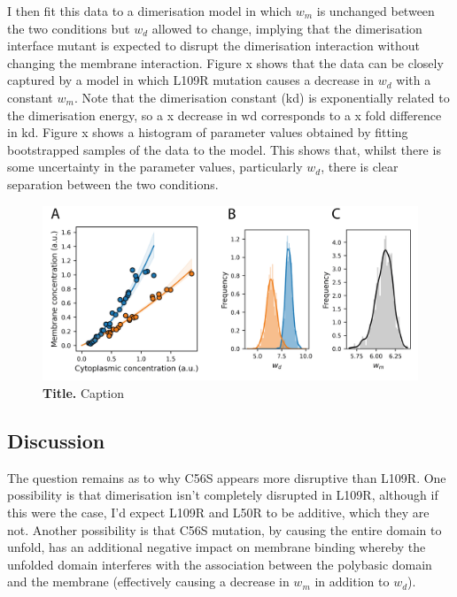 \documentclass[12pt]{"article"}
\newcommand{\mycaption}[2]{\caption[#1]{\textbf{#1.} #2}}
\begin{document}
I then fit this data to a dimerisation model in which $w_m$ is unchanged between the two conditions but $w_d$ allowed to change, implying that the dimerisation interface mutant is expected to disrupt the dimerisation interaction without changing the membrane interaction. Figure x shows that the data can be closely captured by a model in which L109R mutation causes a decrease in $w_d$ with a constant $w_m$. Note that the dimerisation constant (kd) is exponentially related to the dimerisation energy, so a x decrease in wd corresponds to a x fold difference in kd. Figure x shows a histogram of parameter values obtained by fitting bootstrapped samples of the data to the model. This shows that, whilst there is some uncertainty in the parameter values, particularly $w_d$, there is clear separation between the two conditions.\\

\begin{figure}[!h]
\includegraphics[scale=1]{thermodynamic_model_wt_vs_l109r}
\setlength{\abovecaptionskip}{20pt}
\centering
\mycaption{Title}{Caption}
\label{fig:thermodynamic_model_wt_vs_l109r}
\end{figure}


\subsection{Discussion}


The question remains as to why C56S appears more disruptive than L109R. One possibility is that dimerisation isn’t completely disrupted in L109R, although if this were the case, I’d expect L109R and L50R to be additive, which they are not. Another possibility is that C56S mutation, by causing the entire domain to unfold, has an additional negative impact on membrane binding whereby the unfolded domain interferes with the association between the polybasic domain and the membrane (effectively causing a decrease in $w_m$ in addition to $w_d$).\\
\end{document}
